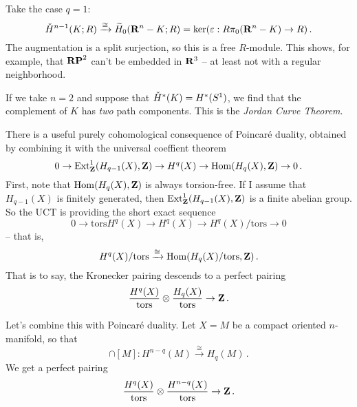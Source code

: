 \begin{example}
Take the case $q=1$:
\[
\check{H}^{n-1}(K;R)\xrightarrow{\cong}\widetilde{H}_0(\mathbf R^n-K;R)
=\ker(\varepsilon:R\pi_0(\mathbf R^n-K)\to R)\,.
\]
The augmentation is a split surjection, so this is a free $R$-module.
This shows, for example, that $\mathbf{RP}^2$ can't be embedded in $\mathbf R^3$ -- at least
not with a regular neighborhood. 

If we take $n=2$ and suppose that $\check{H}^*(K)=H^*(S^1)$, we find that the 
complement of $K$ has {\em two} path components. This is the 
{\em Jordan Curve Theorem}.
\end{example}
There is a useful purely cohomological consequence of Poincar\'e duality,
obtained by combining it with the universal coeffient theorem
\[
0\to\operatorname{Ext}^1_\mathbf Z(H_{q-1}(X),\mathbf Z)\to H^q(X)\to\operatorname{Hom}(H_q(X),\mathbf Z)\to 0\,.
\]
First, note that $\operatorname{Hom}(H_q(X),\mathbf Z)$ is always torsion-free. If I assume that $H_{q-1}(X)$ is finitely generated, then $\operatorname{Ext}^1_\mathbf Z(H_{q-1}(X),\mathbf Z)$ is a finite abelian group. So the UCT is providing the short exact sequence
\[
0\to\mathrm{tors}H^q(X)\to H^q(X)\to H^q(X)/\mathrm{tors}\to0
\]
-- that is, 
\[
H^q(X)/\mathrm{tors}\xrightarrow{\cong}\operatorname{Hom}(H_q(X)/\mathrm{tors},\mathbf Z)\,.
\]
That is to say, the Kronecker pairing descends to a perfect pairing
\[
\frac{H^q(X)}{\mathrm{tors}}\otimes\frac{H_q(X)}{\mathrm{tors}}\to\mathbf Z\,.
\]

Let's combine this with Poincar\'e duality.
Let $X=M$ be a compact oriented $n$-manifold, so that
\[
\cap[M]:H^{n-q}(M)\xrightarrow{\cong}H_q(M)\,.
\]
We get a perfect pairing
\[
\frac{H^q(X)}{\mathrm{tors}}\otimes\frac{H^{n-q}(X)}{\mathrm{tors}}\to\mathbf Z\,.
\]

